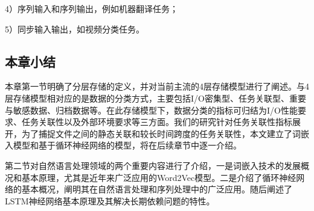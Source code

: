 4）序列输入和序列输出，例如机器翻译任务；

5）同步输入输出，如视频分类任务。



%

\subsection{本章小结}
本章第一节明确了分层存储的定义，并对当前主流的4层存储模型进行了阐述。与4层存储模型相对应的是数据的分类方式，主要包括I/O密集型、任务关联型、重要与敏感数据、归档数据等。在此存储模型下，数据分类的指标可归结为I/O性能要求、任务关联性以及外部环境要求等三方面。我们的研究针对任务关联性指标展开，为了捕捉文件之间的静态关联和较长时间跨度的任务关联性，本文建立了词嵌入模型和基于循环神经网络的模型，将在后续章节中逐一介绍。

第二节对自然语言处理领域的两个重要内容进行了介绍，一是词嵌入技术的发展概况和基本原理，尤其是近年来广泛应用的Word2Vec模型。二是介绍了循环神经网络的基本概况，阐明其在自然语言处理和序列处理中的广泛应用。随后阐述了LSTM神经网络基本原理及其解决长期依赖问题的特性。